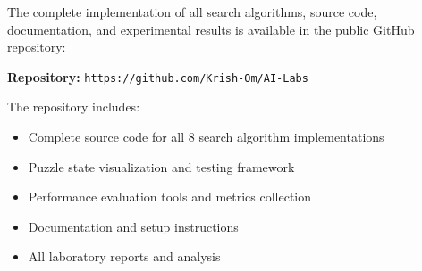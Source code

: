 \documentclass[11pt,a4paper]{article}
\begin{document}
The complete implementation of all search algorithms, source code, documentation, and experimental results is available in the public GitHub repository:

\textbf{Repository:} \texttt{https://github.com/Krish-Om/AI-Labs}

The repository includes:
\begin{itemize}
\item Complete source code for all 8 search algorithm implementations
\item Puzzle state visualization and testing framework
\item Performance evaluation tools and metrics collection
\item Documentation and setup instructions
\item All laboratory reports and analysis
\end{itemize}
\end{document}
